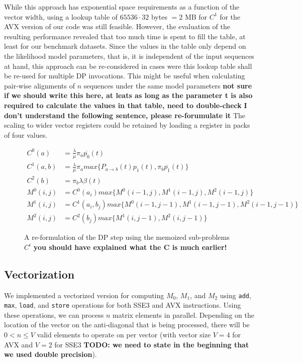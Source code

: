 \documentclass[runningheads,a4paper]{llncs}
\begin{document}
While this approach has exponential space requirements as a function of the vector width, using a lookup table of $65536 \cdot 32$ bytes $= 2$ MB for $C^1$ for 
the AVX version of our code was still feasible. 
However, the evaluation of the resulting performance revealed that too much time is spent to fill the table, at least for our benchmark datasets. 
Since the values in the table only depend on the likelihood model parameters, that is, it is independent of the input sequences at hand, 
this approach can be re-considered in cases were this lookup table shall be re-used for multiple DP invocations. 
This might be useful when calculating pair-wise alignments of $n$ sequences under the same model parameters 
{\bf not sure if we should write this here, at leats as long as the parameter t is also required to calculate the values in that table, need to double-check}
{\bf I don't understand the following sentence, please re-forumulate it} The scaling to wider vector registers could be retained by loading a register in packs of four values.

\begin{figure}
\[
\begin{aligned}
  C^0(a)&=\frac{\lambda}{\mu}\pi_{a}\overline{p_0}(t)\\
  C^1(a, b)&=\frac{\lambda}{\mu}\pi_{a}max\{P_{a \rightarrow b}(t) p_1(t), \pi_{b}\overline{p_1}(t)\}\\
  C^2(b)&=\pi_{b}\lambda\beta(t)\\
  M^0(i,j)&=C^0(a_i)max\{M^0(i-1, j), M^1(i-1,j), M^2(i-1,j)\}\\
  M^1(i,j)&=C^1(a_i,b_j)max\{M^0(i-1, j-1), M^1(i-1,j-1), M^2(i-1,j-1)\}\\
  M^2(i,j)&=C^2(b_j)max\{M^1(i,j-1), M^2(i,j-1)\}
\end{aligned}
\]
\caption{A re-formulation of the DP step using the memoized sub-problems $C^i$ {\bf you should have explained what the C is much earlier!}}
\label{fig:memo}
\end{figure}


\subsection{Vectorization}
\label{ssec:vectorization}

We implemented a vectorized version for computing 
$M_0$, $M_1$, and $M_2$ using \texttt{add}, \texttt{max}, \texttt{load}, and \texttt{store}
operations for both SSE3 and AVX instructions.  
Using these operations, we can process $n$ matrix elements in parallel.  
Depending on the location of the vector on the anti-diagonal that is being processed, there will be $0 < n \leq V$ valid elements to operate on 
per vector (with vector size $V = 4$ for AVX and $V = 2$ for SSE3 {\bf TODO: we need to state in the beginning that we used double precision}). 
\end{document}

